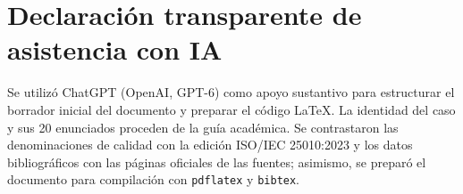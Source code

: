 \documentclass[11pt,a4paper]{article}
\begin{document}
\section{Declaración transparente de asistencia con IA}
Se utilizó ChatGPT (OpenAI, GPT-6) como apoyo sustantivo para estructurar el borrador inicial del documento y preparar el código \LaTeX{}. La identidad del caso y sus 20 enunciados proceden de la guía académica. Se contrastaron las denominaciones de calidad con la edición ISO/IEC 25010:2023 y los datos bibliográficos con las páginas oficiales de las fuentes; asimismo, se preparó el documento para compilación con \texttt{pdflatex} y \texttt{bibtex}. 



\end{document}
